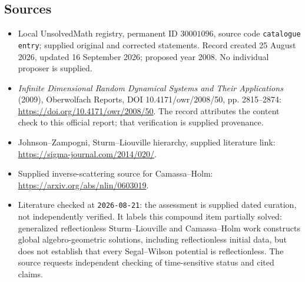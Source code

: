 \documentclass[11pt]{article}
\begin{document}
\subsection{Sources}
\begin{itemize}
\item Local UnsolvedMath registry, permanent ID $30001096$, source code \texttt{catalogue entry}; supplied original and corrected statements. Record created 25 August 2026, updated 16 September 2026; proposed year 2008. No individual proposer is supplied.
\item \emph{Infinite Dimensional Random Dynamical Systems and Their Applications} (2009), Oberwolfach Reports, DOI 10.4171/owr/2008/50, pp. 2815--2874: \url{https://doi.org/10.4171/owr/2008/50}. The record attributes the content check to this official report; that verification is supplied provenance.
\item Johnson--Zampogni, Sturm--Liouville hierarchy, supplied literature link: \url{https://sigma-journal.com/2014/020/}.
\item Supplied inverse-scattering source for Camassa--Holm: \url{https://arxiv.org/abs/nlin/0603019}.
\item Literature checked at \texttt{2026-08-21}: the assessment is supplied dated curation, not independently verified. It labels this compound item partially solved: generalized reflectionless Sturm--Liouville and Camassa--Holm work constructs global algebro-geometric solutions, including reflectionless initial data, but does not establish that every Segal--Wilson potential is reflectionless. The source requests independent checking of time-sensitive status and cited claims.
\end{itemize}
\end{document}

